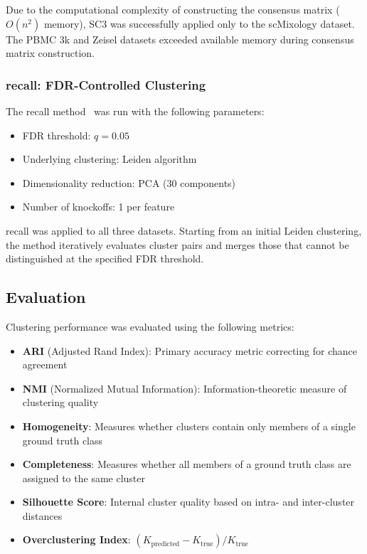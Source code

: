 Due to the computational complexity of constructing the consensus matrix ($O(n^2)$ memory), SC3 was successfully applied only to the scMixology dataset. The PBMC 3k and Zeisel datasets exceeded available memory during consensus matrix construction.

\subsubsection{recall: FDR-Controlled Clustering}

The recall method~\cite{denadel2024recall} was run with the following parameters:
\begin{itemize}[noitemsep]
    \item FDR threshold: $q = 0.05$
    \item Underlying clustering: Leiden algorithm
    \item Dimensionality reduction: PCA (30 components)
    \item Number of knockoffs: 1 per feature
\end{itemize}

recall was applied to all three datasets. Starting from an initial Leiden clustering, the method iteratively evaluates cluster pairs and merges those that cannot be distinguished at the specified FDR threshold.

\subsection{Evaluation}

Clustering performance was evaluated using the following metrics:
\begin{itemize}[noitemsep]
    \item \textbf{ARI} (Adjusted Rand Index): Primary accuracy metric correcting for chance agreement
    \item \textbf{NMI} (Normalized Mutual Information): Information-theoretic measure of clustering quality
    \item \textbf{Homogeneity}: Measures whether clusters contain only members of a single ground truth class
    \item \textbf{Completeness}: Measures whether all members of a ground truth class are assigned to the same cluster
    \item \textbf{Silhouette Score}: Internal cluster quality based on intra- and inter-cluster distances
    \item \textbf{Overclustering Index}: $(K_{\text{predicted}} - K_{\text{true}}) / K_{\text{true}}$
\end{itemize}

